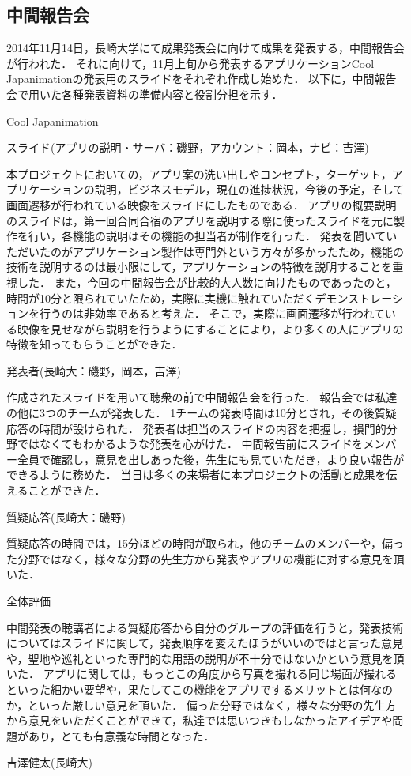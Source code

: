 \subsection{中間報告会}
2014年11月14日，長崎大学にて成果発表会に向けて成果を発表する，中間報告会が行われた．
それに向けて，11月上旬から発表するアプリケーションCool Japanimationの発表用のスライドをそれぞれ作成し始めた．
以下に，中間報告会で用いた各種発表資料の準備内容と役割分担を示す．
 
 Cool Japanimation　

スライド(アプリの説明・サーバ：磯野，アカウント：岡本，ナビ：吉澤) 

本プロジェクトにおいての，アプリ案の洗い出しやコンセプト，ターゲット，アプリケーションの説明，ビジネスモデル，現在の進捗状況，今後の予定，そして画面遷移が行われている映像をスライドにしたものである．
アプリの概要説明のスライドは，第一回合同合宿のアプリを説明する際に使ったスライドを元に製作を行い，各機能の説明はその機能の担当者が制作を行った．
発表を聞いていただいたのがアプリケーション製作は専門外という方々が多かったため，機能の技術を説明するのは最小限にして，アプリケーションの特徴を説明することを重視した．
また，今回の中間報告会が比較的大人数に向けたものであったのと，時間が10分と限られていたため，実際に実機に触れていただくデモンストレーションを行うのは非効率であると考えた．
そこで，実際に画面遷移が行われている映像を見せながら説明を行うようにすることにより，より多くの人にアプリの特徴を知ってもらうことができた．

発表者(長崎大：磯野，岡本，吉澤)

作成されたスライドを用いて聴衆の前で中間報告会を行った．
報告会では私達の他に3つのチームが発表した．
1チームの発表時間は10分とされ，その後質疑応答の時間が設けられた．
発表者は担当のスライドの内容を把握し，損門的分野ではなくてもわかるような発表を心がけた．
中間報告前にスライドをメンバー全員で確認し，意見を出しあった後，先生にも見ていただき，より良い報告ができるように務めた．
当日は多くの来場者に本プロジェクトの活動と成果を伝えることができた． 

質疑応答(長崎大：磯野) 

質疑応答の時間では，15分ほどの時間が取られ，他のチームのメンバーや，偏った分野ではなく，様々な分野の先生方から発表やアプリの機能に対する意見を頂いた． 

全体評価 

中間発表の聴講者による質疑応答から自分のグループの評価を行うと，発表技術についてはスライドに関して，発表順序を変えたほうがいいのではと言った意見や，聖地や巡礼といった専門的な用語の説明が不十分ではないかという意見を頂いた．
アプリに関しては，もっとこの角度から写真を撮れる同じ場面が撮れるといった細かい要望や，果たしてこの機能をアプリでするメリットとは何なのか，といった厳しい意見を頂いた．
偏った分野ではなく，様々な分野の先生方から意見をいただくことができて，私達では思いつきもしなかったアイデアや問題があり，とても有意義な時間となった．

吉澤健太(長崎大)
